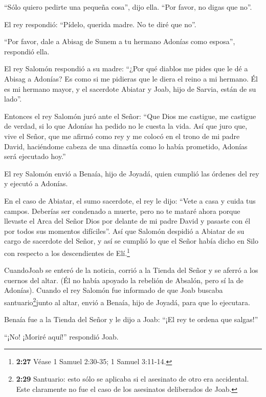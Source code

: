  ``Sólo quiero pedirte una pequeña cosa'', dijo ella. ``Por
favor, no digas que no''.

El rey respondió: ``Pídelo, querida madre. No te diré que no''.

 ``Por favor, dale a Abisag de Sunem a tu hermano Adonías
como esposa'', respondió ella.

 El rey Salomón respondió a su madre: ``¿Por qué diablos me
pides que le dé a Abisag a Adonías? Es como si me pidieras que le diera
el reino a mi hermano. Él es mi hermano mayor, y el sacerdote Abiatar y
Joab, hijo de Sarvia, están de su lado''.

 Entonces el rey Salomón juró ante el Señor: ``Que Dios me
castigue, me castigue de verdad, si lo que Adonías ha pedido no le
cuesta la vida.  Así que juro que, vive el Señor, que me
afirmó como rey y me colocó en el trono de mi padre David, haciéndome
cabeza de una dinastía como lo había prometido, Adonías será ejecutado
hoy.''

 El rey Salomón envió a Benaía, hijo de Joyadá, quien
cumplió las órdenes del rey y ejecutó a Adonías.

 En el caso de Abiatar, el sumo sacerdote, el rey le dijo:
``Vete a casa y cuida tus campos. Deberías ser condenado a muerte, pero
no te mataré ahora porque llevaste el Arca del Señor Dios por delante de
mi padre David y pasaste con él por todos sus momentos difíciles''.
 Así que Salomón despidió a Abiatar de su cargo de
sacerdote del Señor, y así se cumplió lo que el Señor había dicho en
Silo con respecto a los descendientes de Elí.\footnote{\textbf{2:27}
  Véase 1 Samuel 2:30-35; 1 Samuel 3:11-14.}

 CuandoJoab se enteró de la noticia, corrió a la Tienda del
Señor y se aferró a los cuernos del altar. (Él no había apoyado la
rebelión de Absalón, pero sí la de Adonías).  Cuando el rey
Salomón fue informado de que Joab buscaba santuario\footnote{\textbf{2:29}
  Santuario: esto sólo se aplicaba si el asesinato de otro era
  accidental. Este claramente no fue el caso de los asesinatos
  deliberados de Joab.}junto al altar, envió a Benaía, hijo de Joyadá,
para que lo ejecutara.

 Benaía fue a la Tienda del Señor y le dijo a Joab: ``¡El
rey te ordena que salgas!''

``¡No! ¡Moriré aquí!'' respondió Joab.

